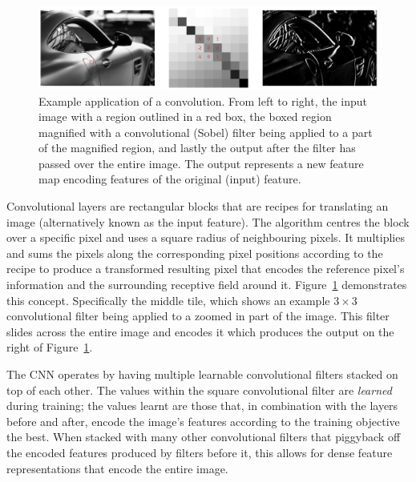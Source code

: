 \documentclass[11pt,twoside]{report}
\begin{document}
\begin{figure}[H]
  \centering
  \includegraphics[width=1\linewidth]{../figures/sobel.png}
  \caption{Example application of a convolution. From left to right, the input image with a region outlined in a red box, the boxed region magnified with a convolutional (Sobel) filter being applied to a part of the magnified region, and lastly the output after the filter has passed over the entire image. The output represents a new feature map encoding features of the original (input) feature.}\label{fig:sobel}
\end{figure}

Convolutional layers are rectangular blocks that are recipes for translating an image (alternatively known as the input feature). The algorithm centres the block over a specific pixel and uses a square radius of neighbouring pixels. It multiplies and sums the pixels along the corresponding pixel positions according to the recipe to produce a transformed resulting pixel that encodes the reference pixel's information and the surrounding receptive field around it. Figure~\ref{fig:sobel} demonstrates this concept. Specifically the middle tile, which shows an example $3 \times 3$ convolutional filter being applied to a zoomed in part of the image. This filter slides across the entire image and encodes it which produces the output on the right of Figure~\ref{fig:sobel}. 

The CNN operates by having multiple learnable convolutional filters stacked on top of each other. The values within the square convolutional filter are \textit{learned} during training; the values learnt are those that, in combination with the layers before and after, encode the image's features according to the training objective the best. When stacked with many other convolutional filters that piggyback off the encoded features produced by filters before it, this allows for dense feature representations that encode the entire image.
\end{document}
